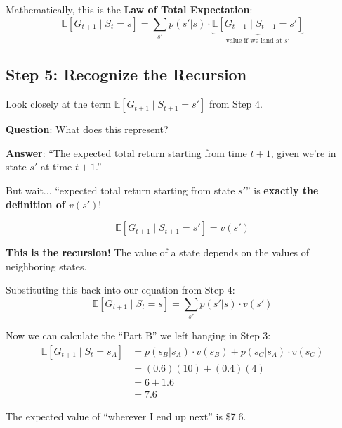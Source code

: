 \documentclass[journal, onecolumn]{IEEEtran}
\begin{document}
Mathematically, this is the \textbf{Law of Total Expectation}:
\begin{equation}
    \mathbb{E}[G_{t+1} \mid S_t = s] = \sum_{s'} p(s'|s) \cdot \underbrace{\mathbb{E}[G_{t+1} \mid S_{t+1} = s']}_{\text{value if we land at } s'}
    \label{eq:total_exp}
\end{equation}

\newpage
\subsection{Step 5: Recognize the Recursion}

Look closely at the term $\mathbb{E}[G_{t+1} \mid S_{t+1} = s']$ from Step 4.

\textbf{Question}: What does this represent?

\textbf{Answer}: ``The expected total return starting from time $t+1$, given we're in state $s'$ at time $t+1$.''

\begin{tcolorbox}[memorybox={The Aha! Moment}]
But wait... ``expected total return starting from state $s'$'' is \textbf{exactly the definition of $v(s')$}!

\[ \mathbb{E}[G_{t+1} \mid S_{t+1} = s'] = v(s') \]

\textbf{This is the recursion!} The value of a state depends on the values of neighboring states.
\end{tcolorbox}

Substituting this back into our equation from Step 4:
\begin{equation}
    \mathbb{E}[G_{t+1} \mid S_t = s] = \sum_{s'} p(s'|s) \cdot v(s')
    \label{eq:weighted_future}
\end{equation}

\begin{tcolorbox}[examplebox={Computing Part B for $s_A$}]
Now we can calculate the ``Part B'' we left hanging in Step 3:
\begin{align*}
\mathbb{E}[G_{t+1} \mid S_t = s_A] &= p(s_B|s_A) \cdot v(s_B) + p(s_C|s_A) \cdot v(s_C) \\[0.3em]
&= (0.6)(10) + (0.4)(4) \\[0.3em]
&= 6 + 1.6 \\[0.3em]
&= \mathbf{7.6}
\end{align*}

The expected value of ``wherever I end up next'' is \$7.6.
\end{tcolorbox}

\vspace{1em}
\end{document}
